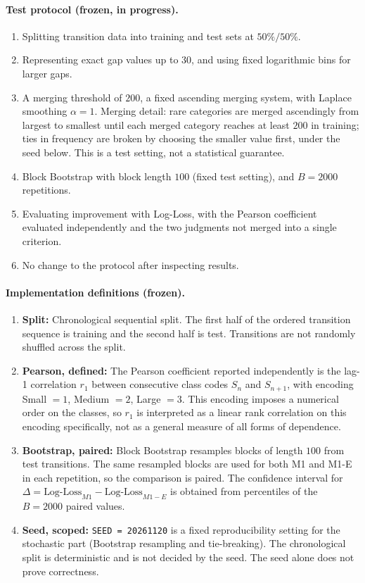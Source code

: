 \documentclass[12pt,a4paper]{article}
\begin{document}
\paragraph{Test protocol (frozen, in progress).}
\begin{enumerate}
    \item Splitting transition data into training and test sets at \(50\%/50\%\).
    \item Representing exact gap values up to \(30\), and using fixed logarithmic bins for larger gaps.
    \item A merging threshold of \(200\), a fixed ascending merging system, with Laplace smoothing \(\alpha=1\). Merging detail: rare categories are merged ascendingly from largest to smallest until each merged category reaches at least $200$ in training; ties in frequency are broken by choosing the smaller value first, under the seed below. This is a test setting, not a statistical guarantee.
    \item Block Bootstrap with block length \(100\) (fixed test setting), and \(B=2000\) repetitions.
    \item Evaluating improvement with Log-Loss, with the Pearson coefficient evaluated independently and the two judgments not merged into a single criterion.
    \item No change to the protocol after inspecting results.
\end{enumerate}
\paragraph{Implementation definitions (frozen).}
\begin{enumerate}
    \item \textbf{Split:} Chronological sequential split. The first half of the ordered transition sequence is training and the second half is test. Transitions are not randomly shuffled across the split.
    \item \textbf{Pearson, defined:} The Pearson coefficient reported independently is the lag-1 correlation $r_1$ between consecutive class codes $S_n$ and $S_{n+1}$, with encoding Small $=1$, Medium $=2$, Large $=3$. This encoding imposes a numerical order on the classes, so $r_1$ is interpreted as a linear rank correlation on this encoding specifically, not as a general measure of all forms of dependence.
    \item \textbf{Bootstrap, paired:} Block Bootstrap resamples blocks of length $100$ from test transitions. The same resampled blocks are used for both M1 and M1-E in each repetition, so the comparison is paired. The confidence interval for $\Delta = \text{Log-Loss}_{M1} - \text{Log-Loss}_{M1-E}$ is obtained from percentiles of the $B=2000$ paired values.
    \item \textbf{Seed, scoped:} \texttt{SEED = 20261120} is a fixed reproducibility setting for the stochastic part (Bootstrap resampling and tie-breaking). The chronological split is deterministic and is not decided by the seed. The seed alone does not prove correctness.
\end{enumerate}
\end{document}
